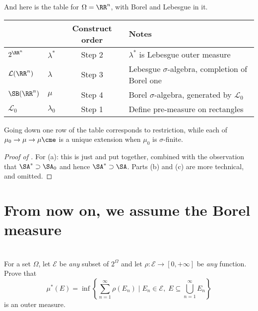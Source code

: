 And here is the table for $\Omega = \RR^n$,
with Borel and Lebesgue in it.
\begin{center}
	\begin{tabular}[h]{llcl}
		& & Construct order & Notes \\ \hline
		$2^{\RR^n}$ & $\lambda^\ast$ & Step 2 &
			$\lambda^\ast$ is Lebesgue outer measure \\[1em]
		$\mathcal L(\RR^n)$ & $\lambda$ & Step 3 &
			Lebesgue $\sigma$-algebra, completion of Borel one \\[1em]
		$\SB(\RR^n)$ & $\mu$ & Step 4 &
			Borel $\sigma$-algebra, generated by $\mathcal{L}_0$ \\[1em]
		$\mathcal L_0$ & $\lambda_0$ & Step 1 & Define pre-measure on rectangles
	\end{tabular}
\end{center}

Going down one row of the table corresponds to restriction,
while each of $\mu_0 \to \mu \to \mu\cme$ is a unique extension
when $\mu_0$ is $\sigma$-finite.
\begin{proof}
	[Proof of ]
	For (a): this is just  and 
	put together, combined with the observation that $\SA^\ast \supset \SA_0$
	and hence $\SA^\ast \supset \SA$.
	Parts (b) and (c) are more technical, and omitted.
\end{proof}

\section{From now on, we assume the Borel measure}

\section{\problemhead}
\begin{dproblem}
	\label{pr:construct_outer_measure}
	For a set $\Omega$,
	let $\mathcal{E}$ be \emph{any} subset of $2^{\Omega}$
	and let $\rho \colon \mathcal{E} \to [0,+\infty]$
	be \emph{any} function.
	Prove that
	\[ \mu^\ast(E) = \inf \left\{ \sum_{n=1}^\infty \rho(E_n) \mid
		E_n \in \mathcal{E}, \;
		E \subseteq \bigcup_{n=1}^\infty E_n \right\} \]
	is an outer measure.
\end{dproblem}

